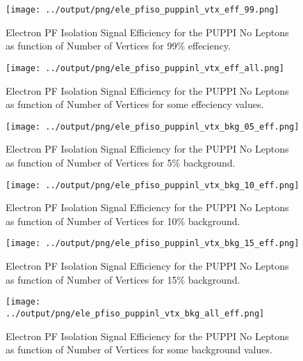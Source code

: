 \documentclass[11pt]{book}
\begin{document}
\begin{figure}[htb]
\centering
\texttt{[image: ../output/png/ele\_pfiso\_puppinl\_vtx\_eff\_99.png]}
\caption{Electron PF Isolation Signal Efficiency for the PUPPI No Leptons as function of Number of Vertices for 99\% effeciency.}
\label{fig:ele_pfiso_vtx_eff_puppinl_eff_99}
\end{figure}

\begin{figure}[htb]
\centering
\texttt{[image: ../output/png/ele\_pfiso\_puppinl\_vtx\_eff\_all.png]}
\caption{Electron PF Isolation Signal Efficiency for the PUPPI No Leptons as function of Number of Vertices for some effeciency values.}
\label{fig:ele_pfiso_vtx_eff_puppinl_eff_all}
\end{figure}

\begin{figure}[htb]
\centering
\texttt{[image: ../output/png/ele\_pfiso\_puppinl\_vtx\_bkg\_05\_eff.png]}
\caption{Electron PF Isolation Signal Efficiency for the PUPPI No Leptons as function of Number of Vertices for 5\% background.}
\label{fig:ele_pfiso_vtx_eff_puppinl_bkg_05_eff}
\end{figure}

\begin{figure}[htb]
\centering
\texttt{[image: ../output/png/ele\_pfiso\_puppinl\_vtx\_bkg\_10\_eff.png]}
\caption{Electron PF Isolation Signal Efficiency for the PUPPI No Leptons as function of Number of Vertices for 10\% background.}
\label{fig:ele_pfiso_vtx_eff_puppinl_bkg_10_eff}
\end{figure}

\begin{figure}[htb]
\centering
\texttt{[image: ../output/png/ele\_pfiso\_puppinl\_vtx\_bkg\_15\_eff.png]}
\caption{Electron PF Isolation Signal Efficiency for the PUPPI No Leptons as function of Number of Vertices for 15\% background.}
\label{fig:ele_pfiso_vtx_eff_puppinl_bkg_15_eff}
\end{figure}

\begin{figure}[htb]
\centering
\texttt{[image: ../output/png/ele\_pfiso\_puppinl\_vtx\_bkg\_all\_eff.png]}
\caption{Electron PF Isolation Signal Efficiency for the PUPPI No Leptons as function of Number of Vertices for some background values.}
\label{fig:ele_pfiso_vtx_eff_puppinl_bkg_all_eff}
\end{figure}
\clearpage
\end{document}
